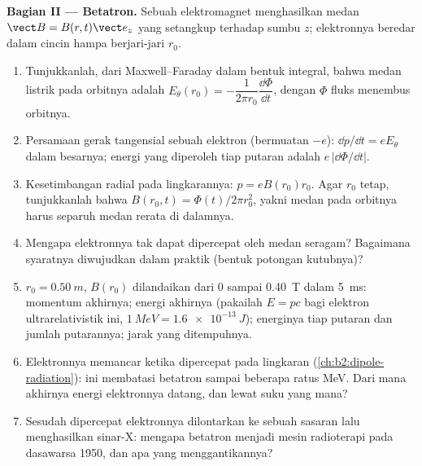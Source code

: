 \begin{problem}
\medskip
\noindent\textbf{Bagian II --- Betatron.}
Sebuah elektromagnet menghasilkan medan $\vect B = B(r, t)\vect e_z$ yang setangkup
terhadap sumbu $z$; elektronnya beredar dalam cincin hampa berjari-jari $r_0$.
\begin{enumerate}[resume]
  \item Tunjukkanlah, dari Maxwell--Faraday dalam bentuk integral, bahwa
        medan listrik pada orbitnya adalah $E_\theta(r_0) = -\dfrac1{2\pi r_0}
        \dfrac{\dd\Phi}{\dd t}$, dengan $\Phi$ fluks menembus orbitnya.
  \item Persamaan gerak tangensial sebuah elektron (bermuatan $-e$):
        $\dd p/\dd t = eE_\theta$ dalam besarnya; energi yang diperoleh tiap putaran adalah
        $e\,|\dd\Phi/\dd t|$.
  \item Kesetimbangan radial pada lingkarannya: $p = eB(r_0)r_0$. Agar $r_0$
        tetap, tunjukkanlah bahwa $B(r_0, t) = \Phi(t)/2\pi r_0^2$, yakni
        medan pada orbitnya harus separuh medan rerata di dalamnya.
  \item Mengapa elektronnya tak dapat dipercepat oleh medan seragam?
        Bagaimana syaratnya diwujudkan dalam praktik (bentuk potongan
        kutubnya)?
  \item $r_0 = \qty{0.50}{m}$, $B(r_0)$ dilandaikan dari $0$ sampai \qty{0.40}{T} dalam
        \qty{5}{ms}: momentum akhirnya; energi akhirnya (pakailah $E = pc$ bagi
        elektron ultrarelativistik ini, $\qty{1}{MeV} = \qty{1.6e-13}{J}$);
        energinya tiap putaran dan jumlah putarannya; jarak yang ditempuhnya.
  \item Elektronnya memancar ketika dipercepat pada lingkaran
        (\cref{ch:b2:dipole-radiation}): ini membatasi betatron sampai beberapa
        ratus MeV. Dari mana akhirnya energi elektronnya datang, dan
        lewat suku  yang mana?
  \item Sesudah dipercepat elektronnya dilontarkan ke sebuah sasaran lalu
        menghasilkan sinar-X: mengapa betatron menjadi mesin radioterapi
        pada dasawarsa 1950, dan apa yang menggantikannya?
\end{enumerate}


\end{problem}
